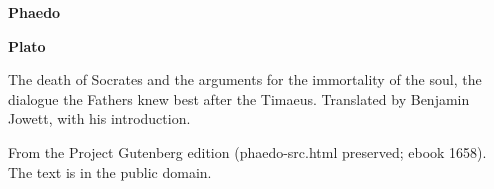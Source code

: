\documentclass[11pt,letterpaper]{article}
\begin{document}
\color{ink}

\begin{titlepage}
\centering
\vspace*{4em}
{\LARGE\bfseries\color{heading} Phaedo\par}
\vspace{2em}
{\Large\bfseries\color{heading} Plato\par}
\vspace{2.5em}
{\itshape\color{subhead}\parbox{0.8\linewidth}{\centering The death of Socrates and the arguments for the immortality of the soul, the dialogue the Fathers knew best after the Timaeus. Translated by Benjamin Jowett, with his introduction.\par}}
\vfill
{\small From the Project Gutenberg edition (phaedo-src.html preserved; ebook 1658). The text is in the public domain.\par}
\vspace{2em}
\end{titlepage}

\tableofcontents


\end{document}
